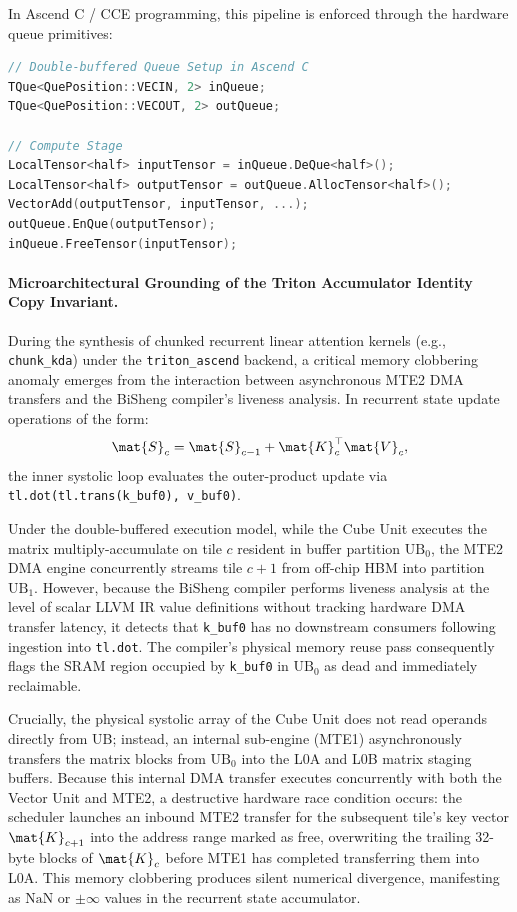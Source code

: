 In Ascend C / CCE programming, this pipeline is enforced through the hardware queue primitives:
\begin{lstlisting}[language=C++]
// Double-buffered Queue Setup in Ascend C
TQue<QuePosition::VECIN, 2> inQueue;
TQue<QuePosition::VECOUT, 2> outQueue;

// Compute Stage
LocalTensor<half> inputTensor = inQueue.DeQue<half>();
LocalTensor<half> outputTensor = outQueue.AllocTensor<half>();
VectorAdd(outputTensor, inputTensor, ...);
outQueue.EnQue(outputTensor);
inQueue.FreeTensor(inputTensor);
\end{lstlisting}

\paragraph{Microarchitectural Grounding of the Triton Accumulator Identity Copy Invariant.} During the synthesis of chunked recurrent linear attention kernels (e.g., \texttt{chunk\_kda}) under the \texttt{triton\_ascend} backend, a critical memory clobbering anomaly emerges from the interaction between asynchronous MTE2 DMA transfers and the BiSheng compiler's liveness analysis. In recurrent state update operations of the form:
\begin{equation}
    \mat{S}_c = \mat{S}_{c-1} + \mat{K}_c^\top \mat{V}_c,
\end{equation}
the inner systolic loop evaluates the outer-product update via \texttt{tl.dot(tl.trans(k\_buf0), v\_buf0)}. 

Under the double-buffered execution model, while the Cube Unit executes the matrix multiply-accumulate on tile $c$ resident in buffer partition $\text{UB}_0$, the MTE2 DMA engine concurrently streams tile $c+1$ from off-chip HBM into partition $\text{UB}_1$. However, because the BiSheng compiler performs liveness analysis at the level of scalar LLVM IR value definitions without tracking hardware DMA transfer latency, it detects that \texttt{k\_buf0} has no downstream consumers following ingestion into \texttt{tl.dot}. The compiler's physical memory reuse pass consequently flags the SRAM region occupied by \texttt{k\_buf0} in $\text{UB}_0$ as dead and immediately reclaimable.

Crucially, the physical systolic array of the Cube Unit does not read operands directly from UB; instead, an internal sub-engine (MTE1) asynchronously transfers the matrix blocks from $\text{UB}_0$ into the L0A and L0B matrix staging buffers. Because this internal DMA transfer executes concurrently with both the Vector Unit and MTE2, a destructive hardware race condition occurs: the scheduler launches an inbound MTE2 transfer for the subsequent tile's key vector $\mat{K}_{c+1}$ into the address range marked as free, overwriting the trailing 32-byte blocks of $\mat{K}_c$ before MTE1 has completed transferring them into L0A. This memory clobbering produces silent numerical divergence, manifesting as $\text{NaN}$ or $\pm\infty$ values in the recurrent state accumulator.

